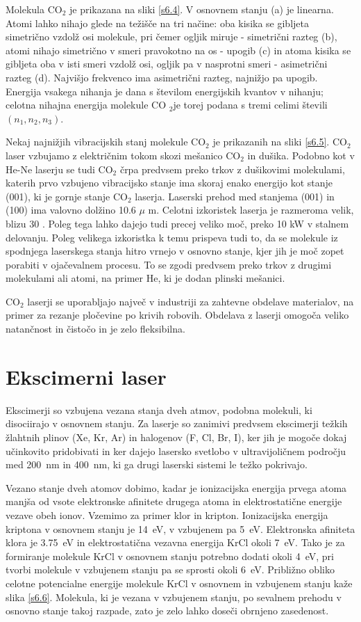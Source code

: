 Molekula CO$_2$ je prikazana na sliki \ref{s6.4}. V osnovnem stanju (a) je
linearna. Atomi lahko nihajo glede na težišče na tri načine: oba kisika
se gibljeta simetrično vzdolž osi molekule, pri čemer ogljik miruje -
simetrični razteg (b), atomi nihajo simetrično v smeri pravokotno na os -
upogib (c) in atoma kisika se gibljeta oba v isti smeri vzdolž osi, ogljik
pa v nasprotni smeri - asimetrični razteg (d). Najvišjo frekvenco ima
asimetrični razteg, najnižjo pa upogib. Energija vsakega nihanja je dana s
številom energijskih kvantov v nihanju; celotna nihajna energija molekule CO%
$_2$je torej podana s tremi celimi števili $(n_1,n_2,n_3)$.

Nekaj najnižjih vibracijskih stanj molekule CO$_2$ je prikazanih na sliki 
\ref{s6.5}. CO$_2$ laser vzbujamo z električnim tokom skozi mešanico CO$_2$
in dušika. Podobno kot v He-Ne laserju se tudi CO$_2$ črpa predvsem preko
trkov z dušikovimi molekulami, katerih prvo vzbujeno vibracijsko stanje ima
skoraj enako energijo kot stanje (001), ki je gornje stanje CO$_2$ laserja.
Laserski prehod med stanjema (001) in (100) ima valovno dolžino 10.6 $\mu$%
m. Celotni izkoristek laserja je razmeroma velik, blizu 30%
. Poleg tega lahko dajejo tudi precej veliko moč, preko
10 kW v stalnem delovanju. Poleg velikega izkoristka k temu prispeva tudi
to, da se molekule iz spodnjega laserskega stanja hitro vrnejo v osnovno
stanje, kjer jih je moč zopet porabiti v ojačevalnem procesu. To se zgodi
predvsem preko trkov z drugimi molekulami ali atomi, na primer He, ki je
dodan plinski mešanici.

CO$_2$ laserji se uporabljajo največ v industriji za zahtevne obdelave
materialov, na primer za rezanje pločevine po krivih robovih. Obdelava z
laserji omogoča veliko natančnost in čistočo in je zelo fleksibilna.

\section{Ekscimerni laser}

Ekscimerji so vzbujena vezana stanja dveh atmov, podobna molekuli, ki
disociirajo v osnovnem stanju. Za laserje so zanimivi predvsem ekscimerji
težkih žlahtnih plinov (Xe, Kr, Ar) in halogenov (F, Cl, Br, I), ker jih
je mogoče dokaj učinkovito pridobivati in ker dajejo lasersko svetlobo v
ultravijoličnem področju med 200~nm in 400~nm, ki ga drugi laserski
sistemi le težko pokrivajo.

Vezano stanje dveh atomov dobimo, kadar je ionizacijska energija prvega
atoma manjša od vsote elektronske afinitete drugega atoma in
elektrostatične energije vezave obeh ionov. Vzemimo za primer klor in
kripton. Ionizacijska energija kriptona v osnovnem stanju je 14~eV, v
vzbujenem pa 5~eV. Elektronska afiniteta klora je 3.75~eV in
elektrostatična vezavna energija KrCl okoli 7~eV. Tako je za formiranje
molekule KrCl v osnovnem stanju potrebno dodati okoli 4~eV, pri tvorbi
molekule v vzbujenem stanju pa se sprosti okoli 6~eV. Približno obliko
celotne potencialne energije molekule KrCl v osnovnem in vzbujenem stanju
kaže slika \ref{s6.6}. Molekula, ki je vezana v vzbujenem stanju, po
sevalnem prehodu v osnovno stanje takoj razpade, zato je zelo lahko doseči
obrnjeno zasedenost.

